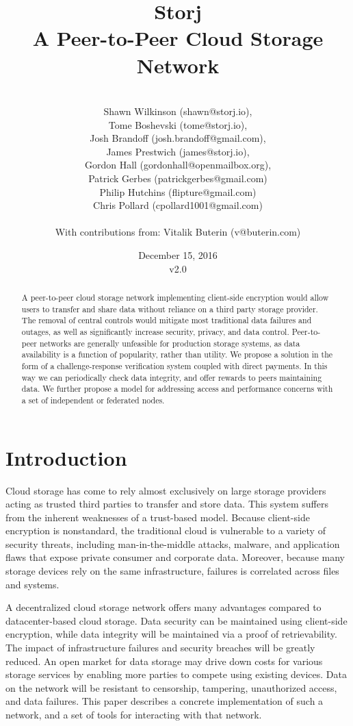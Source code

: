 \documentclass[a4paper,10pt]{article}
\title{\textbf{Storj\\A Peer-to-Peer Cloud Storage Network}}
\author{\\
Shawn Wilkinson (shawn@storj.io),\\
Tome Boshevski (tome@storj.io),\\
Josh Brandoff (josh.brandoff@gmail.com),\\
James Prestwich (james@storj.io),\\
Gordon Hall (gordonhall@openmailbox.org),\\
Patrick Gerbes (patrickgerbes@gmail.com)\\
Philip Hutchins (flipture@gmail.com)\\
Chris Pollard (cpollard1001@gmail.com)\\
\\
With contributions from: Vitalik Buterin (v@buterin.com)
}
\date {December 15, 2016 \\ v2.0}
\begin{document}
\maketitle
\begin{abstract}
A peer-to-peer cloud storage network implementing client-side encryption would
allow users to transfer and share data without reliance on a third party storage
provider. The removal of central controls would mitigate most traditional data
failures and outages, as well as significantly increase security, privacy, and
data control. Peer-to-peer networks are generally unfeasible for production
storage systems, as data availability is a function of popularity, rather than
utility. We propose a solution in the form of a challenge-response verification
system coupled with direct payments. In this way we can periodically check data
integrity, and offer rewards to peers maintaining data. We further propose a
model for addressing access and performance concerns with a set of independent
or federated nodes.
\end{abstract}


\section{Introduction}
Cloud storage has come to rely almost exclusively on large storage providers
acting as trusted third parties to transfer and store data. This system suffers
from the inherent weaknesses of a trust-based model. Because client-side
encryption is nonstandard, the traditional cloud is vulnerable to a variety of
security threats, including man-in-the-middle attacks, malware, and application
flaws that expose private consumer and corporate data. Moreover, because many
storage devices rely on the same infrastructure, failures is correlated across
files and systems.

A decentralized cloud storage network offers many advantages compared to
datacenter-based cloud storage. Data security can be maintained using
client-side encryption, while data integrity will be maintained via a proof of
retrievability. The impact of infrastructure failures and security breaches will
be greatly reduced. An open market for data storage may drive down costs for
various storage services by enabling more parties to compete using existing
devices. Data on the network will be resistant to censorship, tampering,
unauthorized access, and data failures. This paper describes a concrete
implementation of such a network, and a set of tools for interacting with that
network.
\end{document}
